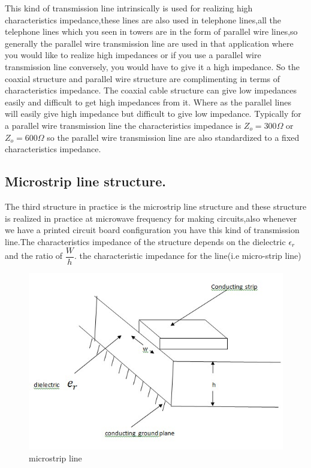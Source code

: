 This kind of transmission line intrinsically is used for realizing high characteristics impedance,these lines are also used in telephone lines,all the telephone lines which you seen in towers are in the form of parallel wire lines,so generally the parallel wire transmission line are used in that application where you would like to realize high impedances or if you use a parallel wire transmission line conversely, you would have to give it a high impedance. So the coaxial structure and parallel wire structure are complimenting in terms of characteristics impedance. The coaxial cable structure can give low impedances easily and difficult to get high impedances from it. Where as the parallel lines will easily give high impedance but difficult to give low impedance. Typically for a parallel wire transmission line the characteristics impedance is $Z_o=300\Omega$ or $Z_o=600\Omega$ so the parallel wire transmission line are also standardized to a fixed characteristics impedance.

\subsection{Microstrip line structure.}
The third structure in practice is the microstrip line structure and these  structure is realized in practice at microwave frequency for making circuits,also whenever we have a printed circuit board configuration you have this kind of transmission line.The characteristics impedance of the structure depends on the dielectric $\epsilon_{r}$ and the ratio of $\dfrac{W}{h}$. the characteristic impedance for the line(i.e micro-strip line)
\begin{figure}[h]
\centering
\includegraphics[width=1\linewidth]{./graphics/microstrip}
\caption{microstrip line}
\end{figure}

